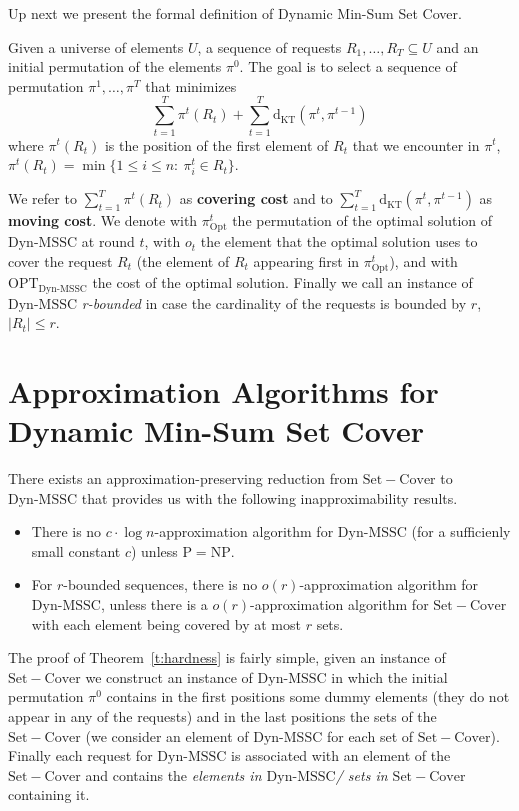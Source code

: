 \documentclass[a4paper,UKenglish,cleveref,autoref, thm-restate]{lipics-v2019}
\def\DSSC{\mathrm{Dyn}\text{-}\mathrm{MSSC}}
\def\dkt{\mathrm{d}_{\mathrm{KT}}}
\begin{document}
\noindent Up next we present the formal definition of Dynamic Min-Sum Set Cover.
\begin{definition}
Given a universe of elements $U$, a sequence of
requests $R_1,\ldots,R_T \subseteq U$ and an initial permutation of the elements $\pi^0$. 
The goal is to select a sequence of permutation $\pi^1,\ldots,\pi^T$ that minimizes 
$$\sum_{t=1}^{T} \pi^t(R_t) + \sum_{t=1}^{T} \dkt ( \pi^t, \pi^{t-1} )$$
where $\pi^t(R_t)$ is the position of the first element of $R_t$ that we encounter in $\pi^t$, $\pi^t(R_t) = \min \{1\leq i \leq n:~ \pi_i^t \in R_t\}$.
\end{definition}
\noindent We refer to $\sum_{t=1}^T\pi^t(R_t)$ as \textbf{covering cost} and to $\sum_{t=1}^T \dkt(\pi^t,\pi^{t-1})$ as \textbf{moving cost}.
We denote with $\pi_{\mathrm{Opt}}^t$ the permutation of the optimal solution of $\DSSC$ at round $t$, with $o_t$ the element that the optimal solution uses to cover the request $R_t$ (the element of $R_t$ appearing first in $\pi_{\mathrm{Opt}}^t$), and with $\mathrm{OPT}_{\DSSC}$ the cost of the optimal solution. Finally we call an instance of $\DSSC$ \textit{r-bounded} in case the cardinality of the requests is bounded by $r$, $|R_t| \leq r$.
\section{Approximation Algorithms for Dynamic Min-Sum Set Cover}\label{s:main}
\noindent There exists an
approximation-preserving reduction from $\mathrm{Set-Cover}$ to  
$\DSSC$ that provides us with the following inapproximability results.
\begin{theorem}\label{t:hardness}
\begin{itemize}
    \item There is no $c \cdot \log n$-approximation algorithm for $\DSSC$ (for a sufficienly small constant $c$) unless $\mathrm{P = NP}$.
    
    \item For $r$-bounded sequences, there is no $o(r)$-approximation algorithm for $\DSSC$, unless there is a
    $o(r)$-approximation algorithm for $\mathrm{Set-Cover}$ with each element being covered by at most $r$ sets.
\end{itemize}
\end{theorem}

\noindent The proof of Theorem~\ref{t:hardness} is fairly simple, given an instance of $\mathrm{Set-Cover}$ we construct an instance of $\DSSC$ in which the initial permutation $\pi^0$ contains in the first positions some dummy elements (they do not appear in any of the requests) and in the last positions the sets of the $\mathrm{Set-Cover}$ (we consider an element of $\DSSC$ for each set of $\mathrm{Set-Cover}$). Finally each request for $\DSSC$ is associated with an element of the $\mathrm{Set-Cover}$ and contains the \textit{elements in $\DSSC$/ sets in $\mathrm{Set-Cover}$} containing it.
\end{document}

